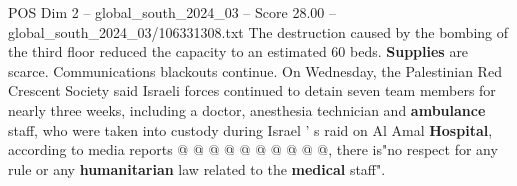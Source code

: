 \begin{textsample}{POS Dim 2 – global\_south\_2024\_03 – Score 28.00 – global\_south\_2024\_03/106331308.txt}
The destruction caused by the bombing of the third floor reduced the capacity to an estimated 60 beds. \textbf{Supplies} are scarce.
Communications blackouts continue.
On Wednesday, the Palestinian Red Crescent Society said Israeli forces continued to detain seven team members for nearly three weeks, including a doctor, anesthesia technician and \textbf{ambulance} staff, who were taken into custody during Israel ' s raid on Al Amal \textbf{Hospital}, according to media reports @ @ @ @ @ @ @ @ @ @, there is"no respect for any rule or any \textbf{humanitarian} law related to the \textbf{medical} staff".

\end{textsample}
